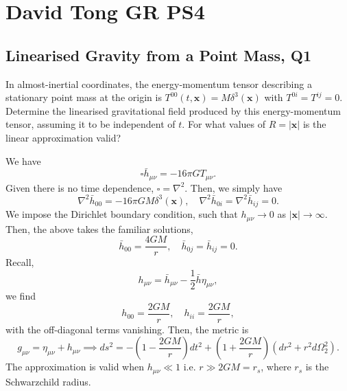 \section{David Tong GR PS4}

\subsection{Linearised Gravity from a Point Mass, Q1}

In almost-inertial coordinates, the energy-momentum tensor describing a stationary point mass at the origin is $T^{00}(t,\mathbf{x}) = M\delta^3(\mathbf{x})$ with $T^{0i} = T^{ij} = 0$. Determine the linearised gravitational field produced by this energy-momentum tensor, assuming it to be independent of $t$. For what values of $R = |\mathbf{x}|$ is the linear approximation valid?
\begin{solution}
    We have
    \begin{equation}
        \square \bar h_{\mu\nu} =- 16\pi G T_{\mu\nu}.
    \end{equation} 
    Given there is no time dependence, $\square = \nabla^2$. Then, we simply have
    \begin{equation}
        \nabla^2 \bar h_{00} = - 16\pi G M \delta^3 (\mathbf{x}), \quad \nabla^2 \bar h_{0i} = \nabla^2 \bar h_{ij} = 0.
    \end{equation}
    We impose the Dirichlet boundary condition, such that $h_{\mu\nu} \to 0$ as $|\mathbf{x}| \to \infty$. Then, the above takes the familiar solutions,
    \begin{equation}
        \bar h_{00} = \frac{4GM}{r}, \quad \bar h_{0j} = \bar h_{ij} =  0.
    \end{equation}
    Recall,
    \begin{equation}
        h_{\mu\nu} = \bar h_{\mu\nu} -\frac{1}{2}\bar h \eta_{\mu\nu},
    \end{equation}
    we find
    \begin{equation}
        h_{00} = \frac{2GM}{r},\quad  h_{ii} = \frac{2GM}{r},
    \end{equation}
    with the off-diagonal terms vanishing. Then, the metric is
    \begin{equation}
        g_{\mu\nu} = \eta_{\mu\nu } + h_{\mu\nu} \implies ds^2 = -\left(1-\frac{2GM}{r}\right)dt^2 + \left(1+\frac{2GM}{r}\right)(dr^2 + r^2 d\Omega_2^2).
    \end{equation}
    The approximation is valid when $h_{\mu\nu} \ll 1$ i.e. $r \gg 2GM = r_s$, where $r_s$ is the Schwarzchild radius.
\end{solution}

